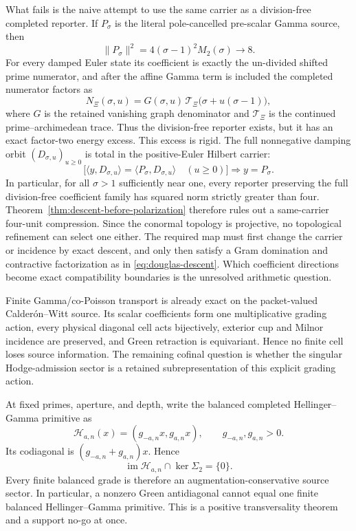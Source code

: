 \documentclass[11pt]{article}
\theoremstyle{definition}
\theoremstyle{remark}
\newcommand{\im}{\operatorname{im}}
\begin{document}
What fails is the naive attempt to use the same carrier as a division-free
completed reporter.  If \(P_\sigma\) is the literal pole-cancelled
pre-scalar Gamma source, then
\[
 \|P_\sigma\|^2
   =4(\sigma-1)^2M_2(\sigma)\longrightarrow8.
\tag{3.7ab}\label{eq:prescalar-eight}
\]
For every damped Euler state its coefficient is exactly the un-divided
shifted prime numerator, and after the affine Gamma term is included the
completed numerator factors as
\[
 N_{\Xi}(\sigma,u)
   =G(\sigma,u)\,\mathcal T_{\Xi}
      \bigl(\sigma+u(\sigma-1)\bigr),
\tag{3.7ac}\label{eq:prescalar-factorization}
\]
where \(G\) is the retained vanishing graph denominator and
\(\mathcal T_{\Xi}\) is the continued prime--archimedean trace.  Thus the
division-free reporter exists, but it has an exact factor-two energy excess.
This excess is rigid.  The full nonnegative damping orbit
\((D_{\sigma,u})_{u\ge0}\) is total in the positive-Euler Hilbert carrier:
\[
 \bigl[\langle y,D_{\sigma,u}\rangle
       =\langle P_\sigma,D_{\sigma,u}\rangle\quad(u\ge0)\bigr]
       \Longrightarrow y=P_\sigma.
\tag{3.7ad}\label{eq:euler-reporter-rigidity}
\]
In particular, for all \(\sigma>1\) sufficiently near one, every reporter
preserving the full division-free coefficient family has squared norm
strictly greater than four.  Theorem~\ref{thm:descent-before-polarization}
therefore rules out a same-carrier four-unit compression.  Since the
conormal topology is projective, no topological refinement can select one
either.  The required map must first change the carrier or incidence by
exact descent, and only then satisfy a Gram domination and contractive
factorization as in \eqref{eq:douglas-descent}.  Which coefficient
directions become exact compatibility boundaries is the unresolved
arithmetic question.

Finite Gamma/co-Poisson transport is already exact on the packet-valued
Calder\'on--Witt source.  Its scalar coefficients form one multiplicative
grading action, every physical diagonal cell acts bijectively, exterior cup
and Milnor incidence are preserved, and Green retraction is equivariant.
Hence no finite cell loses source information.  The remaining cofinal
question is whether the singular Hodge-admission sector is a retained
subrepresentation of this explicit grading action.

At fixed primes, aperture, and depth, write the balanced completed
Hellinger--Gamma primitive as
\[
             \mathcal H_{a,n}(x)=(g_{-a,n}x,g_{a,n}x),
             \qquad g_{-a,n},g_{a,n}>0.
\tag{3.7a}\label{eq:balanced-hellinger}
\]
Its codiagonal is \((g_{-a,n}+g_{a,n})x\).  Hence
\[
 \im\mathcal H_{a,n}\cap\ker\Sigma_2=\{0\}.
\tag{3.7b}\label{eq:hellinger-transverse}
\]
Every finite balanced grade is therefore an
augmentation-conservative source sector.  In particular, a nonzero Green
antidiagonal cannot equal one finite balanced Hellinger--Gamma primitive.
This is a positive transversality theorem and a support no-go at once.
\end{document}
